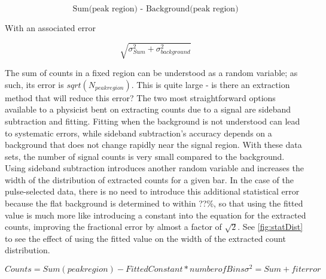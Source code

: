 \begin{equation}
\text{Sum(peak region) - Background(peak region)}
\label{eq:counts}
\end{equation}

With an associated error

\begin{equation}
\sqrt{\sigma_{Sum}^2 + \sigma_{background}^2}
\label{eq:errDef}
\end{equation}

The sum of counts in a fixed region can be understood as a random variable; as such, its error is $sqrt(N_{peakregion})$.  This is quite large - is there an extraction method that will reduce this error?  The two most straightforward options available to a physicist bent on extracting counts due to a signal are sideband subtraction and fitting.  Fitting when the background is not understood can lead to systematic errors, while sideband subtraction's accuracy depends on a background that does not change rapidly near the signal region.  With these data sets, the number of signal counts is very small compared to the background.  Using sideband subtraction introduces another random variable and increases the width of the distribution of extracted counts for a given bar.  In the case of the pulse-selected data, there is no need to introduce this additional statistical error because the flat background is determined to within ??\%, so that using the fitted value is much more like introducing a constant into the equation for the extracted counts, improving the fractional error by almost a factor of $\sqrt{2}$.  See \fig \ref{fig:statDist} to see the effect of using the fitted value on the width of the extracted count distribution.

\begin{equation}
Counts = Sum(peak region) - Fitted Constant * number of Bins
\sigma^2 = Sum + fit error
\label{eq:fitErr}
\end{equation}

